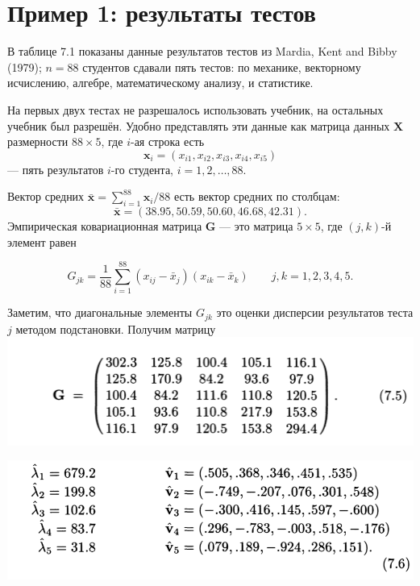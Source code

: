 \section{Пример 1: результаты тестов}
В таблице 7.1 показаны данные результатов тестов из Mardia, Kent and Bibby (1979); $n = 88$ студентов сдавали пять тестов: по механике, векторному исчислению, алгебре, математическому анализу, и статистике.

На первых двух тестах не разрешалось использовать учебник, на остальных учебник был разрешён. Удобно представлять эти данные как матрица  данных $\mathbf X$ размерности $88 \times 5$, где $i$-ая строка есть
\begin{equation}
	\mathbf x_i = (x_{i1}, x_{i2}, x_{i3}, x_{i4}, x_{i5})
\end{equation}
--- пять результатов $i$-го студента, $i = 1,2,\ldots,88.$

Вектор средних $\bar{\mathbf{x}} = \sum_{i = 1}^{88} \mathbf{x}_i/88$ есть вектор средних по столбцам:
\begin{equation}
	\bar{\mathbf x} = (38.95, 50.59, 50.60, 46.68, 42.31).
\end{equation}
 Эмпирическая ковариационная матрица $\mathbf G$ --- это матрица $5 \times 5$, где $(j, k)$-й элемент равен
 
\begin{equation}
G_{jk} = \frac{1}{88}\sum_{i = 1}^{88} (x_{ij} - \bar x_j) (x_{ik} - \bar x_k) \qquad j,k = 1,2,3,4,5.
\end{equation}

Заметим, что диагональные элементы $G_{jk}$ это оценки дисперсии результатов теста $j$ методом подстановки. Получим матрицу
\newline
\includegraphics[width=0.85\linewidth]{6/e75.png}
\newline

\setcounter{equation}{5}
\includegraphics[width=0.85\linewidth]{6/e76.png}
\newline

